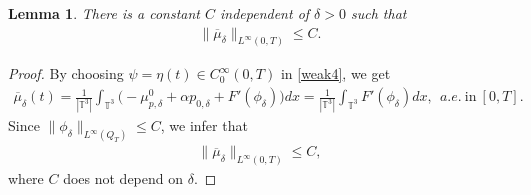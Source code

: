\documentclass[reqno,a4paper,11pt]{amsart}
\theoremstyle{plain}
\newtheorem{lemma}[theorem]{Lemma}
\numberwithin{equation}{section}
\newcommand{\onehalf}{\frac{1}{2}}
\begin{document}



\begin{lemma}\label{lem5.2}
	There is a constant $C$ independent of $\delta > 0$ such that
	\begin{align*}
		\|\overline{\mu}_{\delta}\|_{L^{\infty}(0,T)}\leq C.
	\end{align*}
\end{lemma}
\begin{proof}
	By choosing $\psi=\eta(t)\in C_{0}^{\infty}(0,T)$ in \eqref{weak4}, we get
	\begin{align*}
		\overline{\mu}_{\delta}(t)=\frac{1}{|\mathbb{T}^{3}|}\int_{\mathbb{T}^{3}}\big(-\mu_{p,\delta}^{0}+\alpha p_{0,\delta}+F'(\phi_{\delta})\big)dx=\frac{1}{|\mathbb{T}^{3}|}\int_{\mathbb{T}^{3}}F'(\phi_{\delta})dx,\ \ a .e. \ \text{in}\ [0,T].
	\end{align*}
	Since  $\|\phi_{\delta}\|_{L^{\infty}(Q_T)}\leq C$, we infer that
	\begin{align*}
		\|\overline{\mu}_{\delta}\|_{L^{\infty}(0,T)}\leq C,
	\end{align*}
	where $C$ does not depend on $\delta$.
\end{proof}









		
\end{document}
